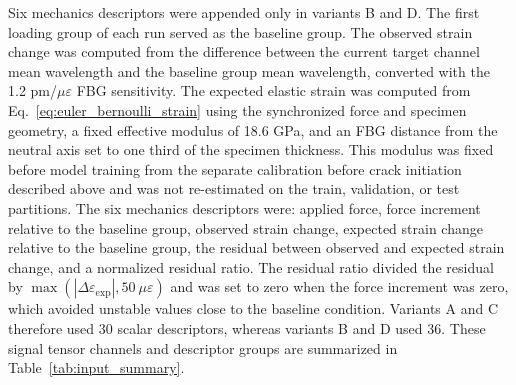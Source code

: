 \documentclass[fleqn,10pt]{wlscirep}
\begin{document}
Six mechanics descriptors were appended only in variants B and D. The first loading group of each run served as the baseline group. The observed strain change was computed from the difference between the current target channel mean wavelength and the baseline group mean wavelength, converted with the 1.2 pm/$\mu\varepsilon$ FBG sensitivity. The expected elastic strain was computed from Eq.~\ref{eq:euler_bernoulli_strain} using the synchronized force and specimen geometry, a fixed effective modulus of 18.6 GPa, and an FBG distance from the neutral axis set to one third of the specimen thickness. This modulus was fixed before model training from the separate calibration before crack initiation described above and was not re-estimated on the train, validation, or test partitions. The six mechanics descriptors were: applied force, force increment relative to the baseline group, observed strain change, expected strain change relative to the baseline group, the residual between observed and expected strain change, and a normalized residual ratio. The residual ratio divided the residual by $\max(|\Delta\varepsilon_{\mathrm{exp}}|, 50~\mu\varepsilon)$ and was set to zero when the force increment was zero, which avoided unstable values close to the baseline condition. Variants A and C therefore used 30 scalar descriptors, whereas variants B and D used 36. These signal tensor channels and descriptor groups are summarized in Table~\ref{tab:input_summary}.
\end{document}
